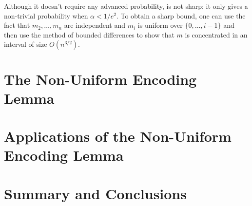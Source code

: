 \documentclass[lotsofwhite]{patmorin}
\begin{document}
\begin{rem}
Although it doesn't require any advanced probability,
 is not sharp; it only gives a non-trivial
probability when $\alpha < 1/e^2$.  To obtain a sharp bound, one can use
the fact that $m_2,\ldots,m_n$ are independent and $m_i$ is uniform over
$\{0,\ldots,i-1\}$ and then use the method of bounded differences \cite{S}
to show that $m$ is concentrated in an interval of size $O(n^{3/2})$.
\end{rem}



\section{The Non-Uniform Encoding Lemma}

\section{Applications of the Non-Uniform Encoding Lemma}


\section{Summary and Conclusions}
\end{document}
